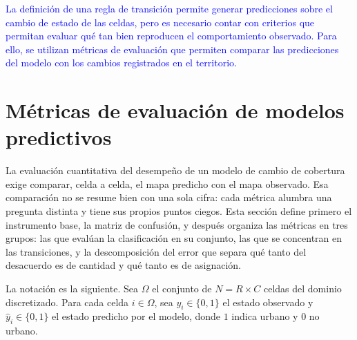 


\textcolor{blue}{La definición de una regla de transición permite generar predicciones sobre el cambio de estado de las celdas, pero es necesario contar con criterios que permitan evaluar qué tan bien reproducen el comportamiento observado. Para ello, se utilizan métricas de evaluación que permiten comparar las predicciones del modelo con los cambios registrados en el territorio.}


\section{Métricas de evaluación de modelos predictivos}

La evaluación cuantitativa del desempeño de un modelo de cambio de cobertura exige comparar, celda a celda, el mapa predicho con el mapa observado. Esa comparación no se resume bien con una sola cifra: cada métrica alumbra una pregunta distinta y tiene sus propios puntos ciegos. Esta sección define primero el instrumento base, la matriz de confusión, y después organiza las métricas en tres grupos: las que evalúan la clasificación en su conjunto, las que se concentran en las transiciones, y la descomposición del error que separa qué tanto del desacuerdo es de cantidad y qué tanto es de asignación.

La notación es la siguiente. Sea $\Omega$ el conjunto de $N = R \times C$ celdas del dominio discretizado. Para cada celda $i \in \Omega$, sea $y_i \in \{0,1\}$ el estado observado y $\hat{y}_i \in \{0,1\}$ el estado predicho por el modelo, donde $1$ indica urbano y $0$ no urbano.

